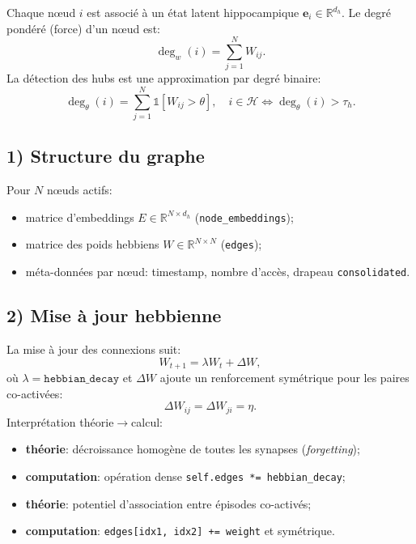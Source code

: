 \documentclass[12pt,a4paper]{article}
\begin{document}
Chaque n\oe ud $i$ est associé à un état latent hippocampique $\mathbf{e}_i \in \mathbb{R}^{d_h}$.  
Le degré pondéré (force) d'un n\oe ud est:
\begin{equation}
\deg_w(i)=\sum_{j=1}^{N} W_{ij}.
\end{equation}
La détection des hubs est une approximation par degré binaire:
\begin{equation}
\deg_\theta(i)=\sum_{j=1}^{N}\mathbb{1}[W_{ij}>\theta], \quad
i \in \mathcal{H} \Leftrightarrow \deg_\theta(i) > \tau_h.
\end{equation}

\subsection{1) Structure du graphe}
Pour $N$ n\oe uds actifs:
\begin{itemize}
    \item matrice d'embeddings $E \in \mathbb{R}^{N \times d_h}$ (\texttt{node\_embeddings});
    \item matrice des poids hebbiens $W \in \mathbb{R}^{N \times N}$ (\texttt{edges});
    \item méta-données par n\oe ud: timestamp, nombre d'accès, drapeau \texttt{consolidated}.
\end{itemize}

\subsection{2) Mise à jour hebbienne}
La mise à jour des connexions suit:
\begin{equation}
W_{t+1} = \lambda W_t + \Delta W,
\end{equation}
où $\lambda=\texttt{hebbian\_decay}$ et $\Delta W$ ajoute un renforcement symétrique pour les paires co-activées:
\begin{equation}
\Delta W_{ij} = \Delta W_{ji} = \eta.
\end{equation}
Interprétation théorie$\rightarrow$calcul:
\begin{itemize}
    \item \textbf{théorie}: décroissance homogène de toutes les synapses (\textit{forgetting});
    \item \textbf{computation}: opération dense \texttt{self.edges *= hebbian\_decay};
    \item \textbf{théorie}: potentiel d'association entre épisodes co-activés;
    \item \textbf{computation}: \texttt{edges[idx1, idx2] += weight} et symétrique.
\end{itemize}
\end{document}
